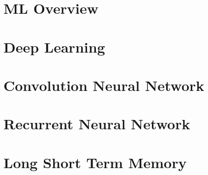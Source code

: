 \section[ML]{ML Overview}


\section[DL]{Deep Learning}






\section[CNN]{Convolution Neural Network}


\section[RNN]{Recurrent Neural Network}




\section[LSTM]{Long Short Term Memory}

